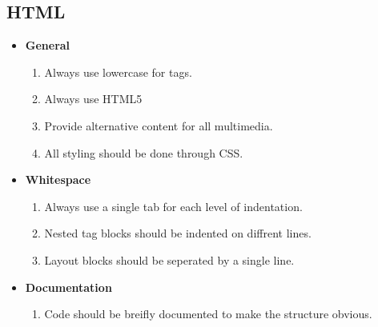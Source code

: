 \documentclass[11pt,a4paper]{article}
\begin{document}
\subsection{HTML} 
\begin{itemize}
\item \textbf{General}
	\begin{enumerate}
	\item Always use lowercase for tags.
    \item Always use HTML5
    \item Provide alternative content for all multimedia.
    \item All styling should be done through CSS.
	\end{enumerate}
\item \textbf{Whitespace}
	\begin{enumerate}
    \item Always use a single tab for each level of indentation.
    \item Nested tag blocks should be indented on diffrent lines.
    \item Layout blocks should be seperated by a single line.
	\end{enumerate}
\item \textbf{Documentation}
	\begin{enumerate}
	\item Code should be breifly documented to make the structure obvious.
	\end{enumerate}
\end{itemize}
\end{document}
